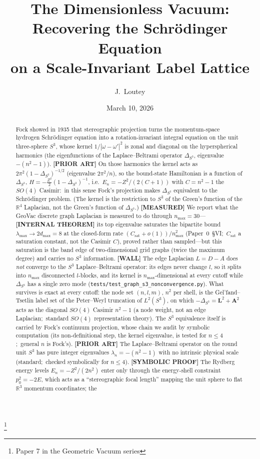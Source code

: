\documentclass[aps,pra,twocolumn,superscriptaddress,longbibliography]{revtex4-2}
\newcommand{\gvc}[2]{#2}
\begin{document}
\title{The Dimensionless Vacuum: Recovering the Schr\"odinger Equation\\on a Scale-Invariant Label Lattice}
\thanks{Paper 7 in the Geometric Vacuum series}

\author{J.~Loutey}

\date{March 10, 2026}

\begin{abstract}
Fock showed in 1935 that stereographic projection turns the momentum-space hydrogen Schr\"odinger equation into a rotation-invariant integral equation on the unit three-sphere $S^3$, whose kernel $1/|\omega - \omega'|^2$ is zonal and diagonal on the hyperspherical harmonics (the eigenfunctions of the Laplace--Beltrami operator $\Delta_{S^3}$, eigenvalue $-(n^2-1)$). \textbf{[PRIOR ART]} On those harmonics the kernel acts as $2\pi^2(1-\Delta_{S^3})^{-1/2}$ (eigenvalue $2\pi^2/n$), so the bound-state Hamiltonian is a function of $\Delta_{S^3}$, $H = -\tfrac{Z^2}{2}(1-\Delta_{S^3})^{-1}$, i.e.\ $E_n = -Z^2/(2(C+1))$ with $C = n^2-1$ the $SO(4)$ Casimir:\ in this sense Fock's projection makes $\Delta_{S^3}$ equivalent to the Schr\"odinger problem. (The kernel is the restriction to $S^3$ of the Green's function of the $\mathbb{R}^4$ Laplacian, not the Green's function of $\Delta_{S^3}$.) \textbf{[MEASURED]} We report what the GeoVac discrete graph Laplacian is measured to do through $n_{\max} = 30$---\textbf{[INTERNAL THEOREM]} its top eigenvalue saturates the bipartite bound $\lambda_{\max} \to 2 d_{\max} = 8$ at the closed-form rate $(C_{\mathrm{sat}} + o(1))/n_{\max}^2$ (Paper~0~\S VI;\ $C_{\mathrm{sat}}$ a saturation constant, not the Casimir $C$), proved rather than sampled---but this saturation is the band edge of two-dimensional grid graphs (twice the maximum degree) and carries no $S^3$ information. \textbf{[WALL]} \gvc{graph-s3-wall}{The edge Laplacian $L = D - A$ does \emph{not} converge to the $S^3$ Laplace--Beltrami operator: its edges never change $l$, so it splits into $n_{\max}$ disconnected $l$-blocks, and its kernel is $n_{\max}$-dimensional at every cutoff while $\Delta_{S^3}$ has a single zero mode (\texttt{tests/test\_graph\_s3\_nonconvergence.py})}. What survives is exact at every cutoff: the node set $(n, l, m)$, $n^2$ per shell, is the Gel'fand--Tsetlin label set of the Peter--Weyl truncation of $L^2(S^3)$, on which $-\Delta_{S^3} = \mathbf{L}^2 + \mathbf{A}^2$ acts as the diagonal $SO(4)$ Casimir $n^2 - 1$ (a node weight, not an edge Laplacian;\ standard $SO(4)$ representation theory). The $S^3$ equivalence itself is carried by Fock's continuum projection, whose chain we audit by symbolic computation (its non-definitional step, the kernel eigenvalue, is tested for $n \le 4$;\ general $n$ is Fock's). \textbf{[PRIOR ART]} The Laplace--Beltrami operator on the round unit $S^3$ has pure integer eigenvalues $\lambda_n = -(n^2 - 1)$ with no intrinsic physical scale (standard;\ checked symbolically for $n \le 4$). \textbf{[SYMBOLIC PROOF]} The Rydberg energy levels $E_n = -Z^2/(2n^2)$ enter only through the energy-shell constraint $p_0^2 = -2E$, which acts as a ``stereographic focal length'' mapping the unit sphere to flat $\mathbb{R}^3$ momentum coordinates; the 
\end{abstract}
\end{document}
